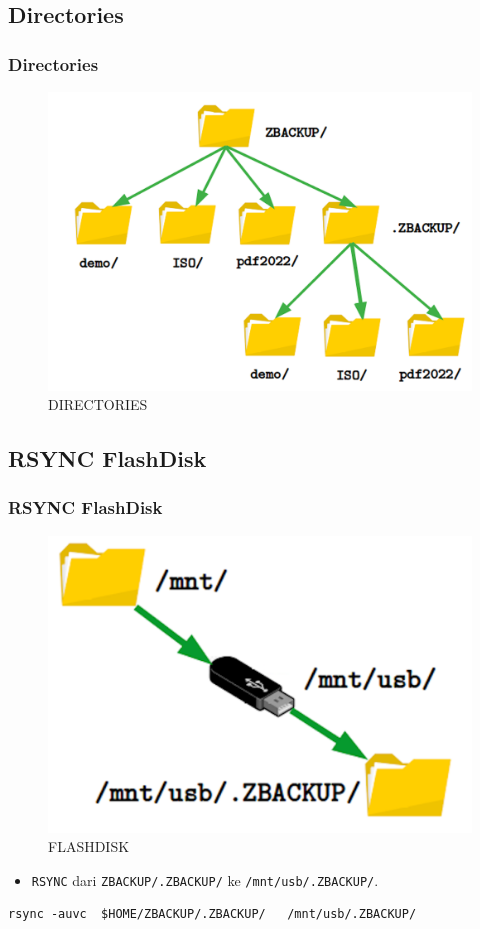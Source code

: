 \documentclass[xcolor=table, notheorems, hyperref={pdfpagelabels=false}]{beamer}
\begin{document}
\begin{frame}[fragile]
\section{Directories}
\frametitle{Directories}
\begin{figure}
\includegraphics[width=0.69\linewidth]{DIRECTORIES}
\caption{DIRECTORIES}
\end{figure}
\end{frame}

\begin{frame}[fragile]
\section{RSYNC FlashDisk}
\frametitle{RSYNC FlashDisk}
\begin{figure}
\includegraphics[width=0.61\linewidth]{FLASHDISK}
\caption{FLASHDISK}
\end{figure}
\begin{itemize}
\item \texttt{RSYNC} dari \texttt{ZBACKUP/.ZBACKUP/} ke \texttt{/mnt/usb/.ZBACKUP/}.
\end{itemize}
\begin{lstlisting}[basicstyle=\ttfamily\small]
    rsync -auvc  $HOME/ZBACKUP/.ZBACKUP/   /mnt/usb/.ZBACKUP/
\end{lstlisting}
\end{frame}
\end{document}

